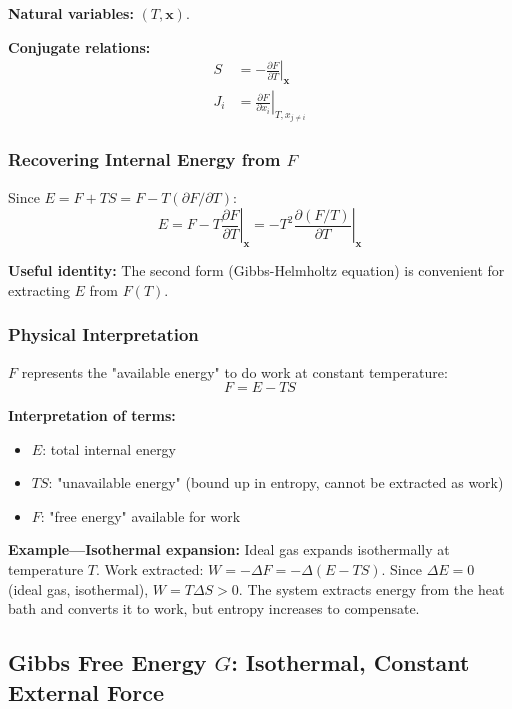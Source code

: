 \documentclass[9pt,twocoloumn]{article}
\begin{document}
\textbf{Natural variables:} $(T, \mathbf{x})$.

\textbf{Conjugate relations:}
\begin{align}
S &= -\left. \frac{\partial F}{\partial T} \right|_{\mathbf{x}} \\
J_i &= \left. \frac{\partial F}{\partial x_i} \right|_{T, x_{j \neq i}}
\end{align}

\subsubsection{Recovering Internal Energy from $F$}

Since $E = F + TS = F - T(\partial F/\partial T)$:
\begin{equation}
\boxed{E = F - T \left. \frac{\partial F}{\partial T} \right|_{\mathbf{x}} = -T^2 \left. \frac{\partial (F/T)}{\partial T} \right|_{\mathbf{x}}}
\end{equation}

\textbf{Useful identity:} The second form (Gibbs-Helmholtz equation) is convenient for extracting $E$ from $F(T)$.

\subsubsection{Physical Interpretation}

$F$ represents the "available energy" to do work at constant temperature:
\begin{equation}
F = E - TS
\end{equation}

\textbf{Interpretation of terms:}
\begin{itemize}
    \item $E$: total internal energy
    \item $TS$: "unavailable energy" (bound up in entropy, cannot be extracted as work)
    \item $F$: "free energy" available for work
\end{itemize}

\textbf{Example—Isothermal expansion:} Ideal gas expands isothermally at temperature $T$. Work extracted: $W = -\Delta F = -\Delta(E - TS)$. Since $\Delta E = 0$ (ideal gas, isothermal), $W = T \Delta S > 0$. The system extracts energy from the heat bath and converts it to work, but entropy increases to compensate.

\subsection{Gibbs Free Energy $G$: Isothermal, Constant External Force}
\end{document}
